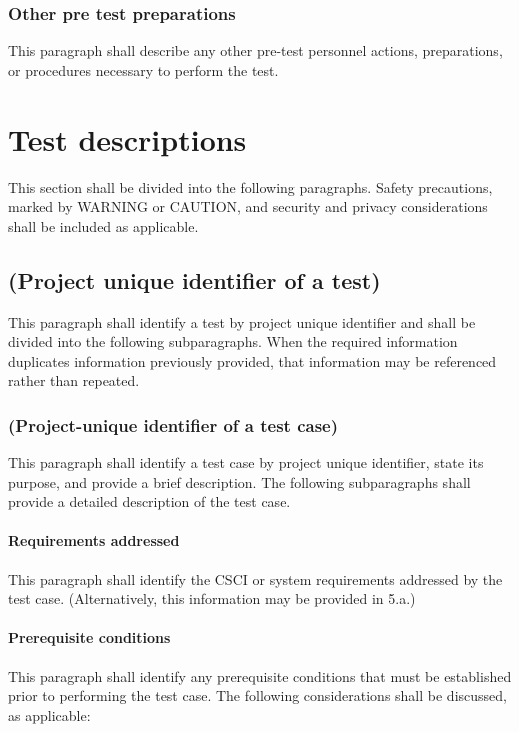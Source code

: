 \subsubsection{Other pre test preparations}

This paragraph shall describe any other pre-test personnel actions,
preparations, or procedures necessary to perform the test.

\section{Test descriptions}

This section shall be divided into the following paragraphs. Safety
precautions, marked by WARNING or CAUTION, and security and privacy
considerations shall be included as applicable.

\subsection{(Project unique identifier of a test)}

This paragraph shall identify a test by project unique identifier and
shall be divided into the following subparagraphs. When the required
information duplicates information previously provided, that information
may be referenced rather than repeated.

\subsubsection{(Project-unique identifier of a test case)}

This paragraph shall identify a test case by project unique identifier,
state its purpose, and provide a brief description. The following
subparagraphs shall provide a detailed description of the test case.

\paragraph{Requirements addressed}

This paragraph shall identify the CSCI or system requirements addressed
by the test case. (Alternatively, this information may be provided in
5.a.)

\paragraph{Prerequisite conditions}

This paragraph shall identify any prerequisite conditions that must be
established prior to performing the test case. The following
considerations shall be discussed, as applicable:

